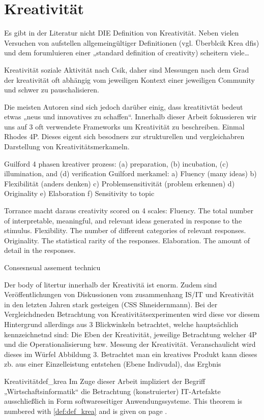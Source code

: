 \section{Kreativität}
Es gibt in der Literatur nicht DIE Definition von Kreativität. Neben vielen Versuchen von aufstellen allgemeingültiger Definitionen (vgl. Überblcik Krea dfis) und dem forumluieren einer „standard definition of creativity) scheitern viele…

Kreativität soziale Aktivität nach Csik, daher sind Messungen nach dem Grad der kreativität oft abhängig vom jeweiligen Kontext einer jeweiligen Community und schwer zu pauschalisieren.

Die meisten Autoren sind sich jedoch darüber einig, dass kreatitivtät bedeut etwas „neus und innovatives zu schaffen“.
Innerhalb dieser Arbeit fokussieren wir uns auf 3 oft verwendete Frameworks um Kreativität zu beschreiben. Einmal Rhodes 4P. Dieses eigent sich besodners zur strukturellen und vergleichabren Darstellung von Kreativitätsmerkameln.

Guilford 4 phasen kreativer prozess: (a) preparation, (b) incubation, (c) illumination, and (d) verification
Guilford merkamel:
a)	Fluency (many ideas)
b)	Flexibilität (anders denken)
c)	Problemsensitivität (problem erkennen)
d)	Originality
e)	Elaboration
f)	Sensitivity to topic

Torrance macht daraus creativity scored on 4 scales:
Fluency. The total number of interpretable, meaningful, and relevant ideas generated in response to the stimulus.
Flexibility. The number of different categories of relevant responses.
Originality. The statistical rarity of the responses.
Elaboration. The amount of detail in the responses.

Consesnsual assement technicu

Der body of litertur innerhalb der Kreativitä ist enorm. Zudem sind Veröffentlichungen von Diskussionen vom zusammenhang IS/IT und Kreativität in den letzten Jahren stark gesteigen (CSS Shneidernmann). Bei der Vergleichdneden Betrachtung von Kreativitätsexperimenten wird diese vor diesem Hintergrund allerdings aus 3 Blickwinkeln betrachtet, welche hauptsächlich kennzeichnetnd sind: Die Eben der Kreativität, jeweilige Betrachtung welcher 4P und die Operationalisierung bzw. Messung der Kreativität. Veranschaulicht wird dieses im Würfel Abbildung 3. Betrachtet man ein kreatives Produkt kann dieses zb. aus einer Einzelleistung entstehen (Ebene Indivudal), das  Ergbnis 

\begin{mydef}{Kreativität}{def_krea}
  Im Zuge dieser Arbeit impliziert der Begriff „Wirtschaftsinformatik“ die Betrachtung (konstruierter) IT-Artefakte ausschließlich in Form softwareseitiger Anwendungssysteme.
  This theorem is numbered with  \ref{def:def_krea} and is given on page \pageref{def:def_krea}.
\end{mydef}

